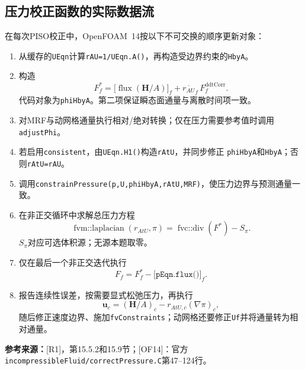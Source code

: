 \documentclass[UTF8,12pt,a4paper]{ctexart}
\numberwithin{equation}{section}
\newcommand{\Rone}{\textnormal{[R1]}}
\newcommand{\OFfourteen}{\textnormal{[OF14]}}
\newcommand{\source}[1]{\par\smallskip\noindent\colorbox{sourcebg}{%
  \parbox{0.955\linewidth}{\footnotesize\color{sourcegray}\textbf{参考来源：}#1}}\par\smallskip}
\begin{document}
\subsection{压力校正函数的实际数据流}
在每次PISO校正中，OpenFOAM~14按以下不可交换的顺序更新对象：
\begin{enumerate}
  \item 从缓存的\texttt{UEqn}计算\texttt{rAU=1/UEqn.A()}，再构造受边界约束的\texttt{HbyA}。
  \item 构造
  \begin{equation}
    \boxed{F_f^*=
    \bigl[\operatorname{flux}(\bm H/A)\bigr]_f
    +\overline{r_{AU}}_f\,F_f^{\mathrm{ddtCorr}}.}
    \label{eq:of_phiHbyA}
  \end{equation}
  代码对象为\texttt{phiHbyA}。第二项保证瞬态面通量与离散时间项一致。
  \item 对MRF与动网格通量执行相对/绝对转换；仅在压力需要参考值时调用\texttt{adjustPhi}。
  \item 若启用\texttt{consistent}，由\texttt{UEqn.H1()}构造\texttt{rAtU}，并同步修正
  \texttt{phiHbyA}和\texttt{HbyA}；否则\texttt{rAtU=rAU}。
  \item 调用\texttt{constrainPressure(p,U,phiHbyA,rAtU,MRF)}，使压力边界与预测通量一致。
  \item 在非正交循环中求解总压力方程
  \begin{equation}
    \boxed{\operatorname{fvm::laplacian}(r_{AtU},\pi)
    =\operatorname{fvc::div}(F^*)-S_\pi.}
    \label{eq:of_total_pressure}
  \end{equation}
  $S_\pi$对应可选体积源；无源本题取零。
  \item 仅在最后一个非正交迭代执行
  \begin{equation}
    \boxed{F_f=F_f^*-\bigl[\texttt{pEqn.flux()}\bigr]_f.}
    \label{eq:of_flux_update}
  \end{equation}
  \item 报告连续性误差，按需要显式松弛压力，再执行
  \begin{equation}
    \boxed{\bm u_c=(\bm H/A)_c-r_{AtU,c}(\nabla\pi)_c,}
    \label{eq:of_U_update}
  \end{equation}
  随后修正速度边界、施加\texttt{fvConstraints}；动网格还要修正\texttt{Uf}并将通量转为相对通量。
\end{enumerate}
\source{\Rone，第15.5.2和15.9节；\OFfourteen：官方
\texttt{incompressibleFluid/correctPressure.C}第47--124行。}
\end{document}
